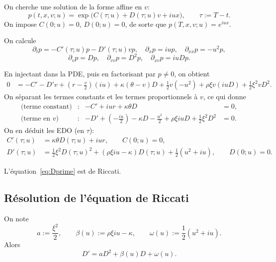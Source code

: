 \documentclass[11pt,a4paper]{article}
\newcommand{\1}{\mathbf{1}}
\begin{document}
On cherche une solution de la forme affine en $v$:
\begin{equation}
p(t,x,v;u) = \exp\!\big(C(\tau;u) + D(\tau;u)v + iux\big),
\qquad \tau := T-t.
\end{equation}
On impose $C(0;u)=0$, $D(0;u)=0$, de sorte que $p(T,x,v;u)=e^{iux}$.

On calcule
\[
\partial_t p = -C'(\tau;u)p - D'(\tau;u)v p,\quad
\partial_x p = iup,\quad
\partial_{xx}p = -u^2p,
\]
\[
\partial_v p = Dp,\quad
\partial_{vv}p = D^2p,\quad
\partial_{xv}p = i u D p.
\]

En injectant dans la PDE, puis en factorisant par $p\neq0$, on obtient
\begin{align}
0 &= -C' - D'v
+ \left(r - \frac{v}{2}\right)(iu)
+ \kappa(\theta - v)D
+ \frac{1}{2} v(-u^2)
+ \rho\xi v(iuD)
+ \frac{1}{2}\xi^2 v D^2.
\end{align}
On s\'eparant les termes constants et les termes proportionnels \`a $v$, ce qui donne
\begin{align}
\text{(terme constant)}  &:& -C' + iur + \kappa\theta D &= 0,\\
\text{(terme en $v$)}    &:& -D'
 + \left(-\frac{iu}{2}\right)
 - \kappa D
 - \frac{u^2}{2}
 + \rho\xi iu D
 + \frac{1}{2}\xi^2 D^2 &= 0.
\end{align}
On en d\'eduit les EDO (en $\tau$):
\begin{align}
C'(\tau;u) &= \kappa\theta D(\tau;u) + i u r, \qquad C(0;u)=0,
\label{eq:Cprime}\\[3pt]
D'(\tau;u) &= \frac{1}{2}\xi^2 D(\tau;u)^2
           + (\rho\xi i u - \kappa)D(\tau;u)
           + \frac{1}{2}(u^2 + i u),\qquad D(0;u)=0.
\label{eq:Dprime}
\end{align}

L'\'equation~\eqref{eq:Dprime} est de Riccati.

\subsection{R\'esolution de l'\'equation de Riccati}

On note
\begin{equation}
a := \frac{\xi^2}{2},\qquad
\beta(u) := \rho\xi i u - \kappa,\qquad
\omega(u) := \frac{1}{2}(u^2+i u).
\end{equation}
Alors
\begin{equation}
D' = a D^2 + \beta(u) D + \omega(u).
\end{equation}
\end{document}
